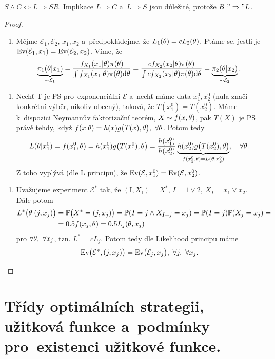 \begin{theorem}
	$S\wedge C\Leftrightarrow L\Rightarrow SR$. Implikace $L\Rightarrow C$ a~$L\Rightarrow S$ jsou důležité, protože $B~"\Rightarrow" L$.
	\begin{proof}
		\begin{enumerate}[$B"\Rightarrow"L$:]
			\item Mějme $\mathcal{E}_1,\mathcal{E}_2$, $x_1,x_2$ a~předpokládejme, že $L_1(\theta)=c L_2(\theta)$. Ptáme se, jestli je $\mathrm{Ev}(\mathcal{E}_1,x_1)=\mathrm{Ev}(\mathcal{E}_2,x_2)$. Víme, že $$ \underbrace{\pi_1(\theta|x_1)}_{\sim\mathcal{E}_1}=\frac{f_{X_1}(x_1|\theta)\pi(\theta)}{\int f_{X_1}(x_1|\theta)\pi(\theta)\mathrm{d}\theta}=\frac{c f_{X_2}(x_2|\theta)\pi(\theta)}{\int c f_{X_2}(x_2|\theta)\pi(\theta)\mathrm{d}\theta}=\underbrace{\pi_2(\theta| x_2)}_{\sim\mathcal{E}_2}.$$
		\end{enumerate}
	\begin{enumerate}[$L\Rightarrow S$:]
		\item Nechť T je PS pro~exponenciální $\mathcal{E}$ a~nechť máme data $x_1^0,x_2^0$ (nula značí konkrétní výběr, nikoliv obecný), taková, že $T(x_1^0)=T(x_2^0)$. Máme k~dispozici Neymannův faktorizační teorém, $X\sim f(x,\theta)$, pak $T(X)$ je PS právě tehdy, když $f(x|\theta)=h(x)g\big(T(x),\theta \big),~\forall\theta$. Potom tedy 
		$$ L(\theta|x_1^0)=f(x_1^0,\theta)=h(x_1^0)g\big( T(x_1^0),\theta \big)=\frac{h(x_1^0)}{h(x_2^0)}\underbrace{h(x_2^0)g\big(T(x_2^0),\theta \big)}_{f(x_2^0,\theta)=L(\theta|x_2^0)},\quad\forall\theta.$$
		Z toho vyplývá (dle L principu), že $\mathrm{Ev}(\mathcal{E},x_1^0)=\mathrm{Ev}(\mathcal{E},x_2^0)$.
\end{enumerate}
\begin{enumerate}[$L\Rightarrow C$:]
	\item Uvažujeme experiment $\mathcal{E}^*$ tak, že $(\mathrm{I},X_\mathrm{I})=X^*$, $I=1\vee 2,~X_I=x_1\vee x_2$. 
	Dále potom \[
	\begin{split}
	L^*\big(\theta|(j,x_j)\big)&=\mathbb{P}\big(X^*=(j,x_j) \big)=\mathbb{P}(I=j\wedge X_{I=j}=x_j)=\mathbb{P}(I=j)\mathbb{P}(X_j=x_j)=\\&=0.5f(x_j,\theta)=0.5 L_j(\theta,x_j)
	\end{split}
	\]
	pro $\forall\theta,~\forall x_j$, tzn. $L^*=c L_j$. Potom tedy dle Likelihood principu máme $$\mathrm{Ev}\big(\mathcal{E}^*,(j,x_j) \big)=\mathrm{Ev}\big(\mathcal{E}_j,x_j \big),~\forall j,~\forall x_j.$$
\end{enumerate}
	\end{proof}
\end{theorem}

\chapter{Třídy optimálních strategii, užitková funkce a~podmínky pro~existenci užitkové funkce.}

